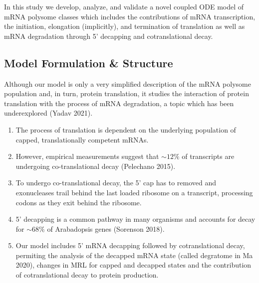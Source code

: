 \documentclass[review]{elsarticle}
\newcommand\mmpar[1]{\marginpar{\begin{spacing}{0.7}\raggedright \singlespacing \tiny \textbf{M:} #1 \end{spacing}}}  %
\newcommand\rmpar[1]{\marginpar{\begin{spacing}{0.7}\raggedright \singlespacing \tiny \textbf{R:} #1 \end{spacing}}}  %
\begin{document}
In this study we develop, analyze, and validate a novel coupled ODE model of mRNA polysome classes %
which includes the contributions of mRNA transcription, the initiation, elongation (implicitly), and termination of translation as well as mRNA degradation through 5' decapping and cotranslational decay.
\subsection{Model Formulation \& Structure}

Although our model is only a very simplified description of the mRNA polysome population and, in turn, protein translation, it studies the interaction of protein translation with the process of mRNA degradation, a topic which has been underexplored (Yadav 2021).

\begin{enumerate}
\item The process of translation is dependent on the underlying population of capped, translationally competent mRNAs. 
\item However, empirical measurements suggest that $\sim 12\%$ of transcripts are undergoing co-translational decay (Pelechano 2015).
\item To undergo co-translational decay, the 5' cap has to removed and exonucleases trail behind the last loaded ribosome on a transcript, processing codons as they exit behind the ribosome.
\item 5' decapping is a common pathway in many organisms and accounts for decay for $\sim 68\%$ of Arabadopsis genes (Sorenson 2018).
\item Our model includes 5' mRNA decapping followed by cotranslational decay, permiting the analysis of the decapped mRNA state (called degratome in Ma 2020), changes in MRL for capped and decapped states and the contribution of cotranslational decay to protein production.
  \end{enumerate}
  
\end{document}
